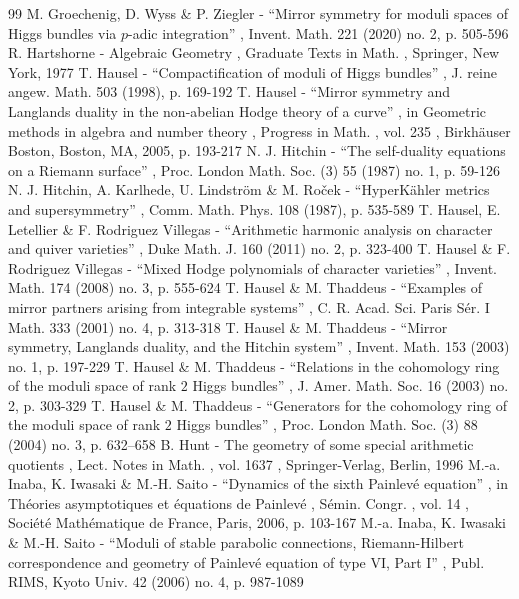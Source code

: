 \documentclass[11pt]{article}
\theoremstyle{definition}
\theoremstyle{plain}
\begin{document}
\begin{thebibliography}{99}
 M. Groechenig, D. Wyss \& P. Ziegler - “Mirror symmetry for moduli spaces of Higgs bundles via $p$-adic integration” , Invent. Math. 221 (2020) no. 2, p. 505-596
 R. Hartshorne - Algebraic Geometry , Graduate Texts in Math. , Springer, New York, 1977
 T. Hausel - “Compactification of moduli of Higgs bundles” , J. reine angew. Math. 503 (1998), p. 169-192
 T. Hausel - “Mirror symmetry and Langlands duality in the non-abelian Hodge theory of a curve” , in Geometric methods in algebra and number theory , Progress in Math. , vol. 235 , Birkhäuser Boston, Boston, MA, 2005, p. 193-217
 N. J. Hitchin - “The self-duality equations on a Riemann surface” , Proc. London Math. Soc. (3) 55 (1987) no. 1, p. 59-126
 N. J. Hitchin, A. Karlhede, U. Lindström \& M. Roček - “HyperKähler metrics and supersymmetry” , Comm. Math. Phys. 108 (1987), p. 535-589
 T. Hausel, E. Letellier \& F. Rodriguez Villegas - “Arithmetic harmonic analysis on character and quiver varieties” , Duke Math. J. 160 (2011) no. 2, p. 323-400
 T. Hausel \& F. Rodriguez Villegas - “Mixed Hodge polynomials of character varieties” , Invent. Math. 174 (2008) no. 3, p. 555-624
 T. Hausel \& M. Thaddeus - “Examples of mirror partners arising from integrable systems” , C. R. Acad. Sci. Paris Sér. I Math. 333 (2001) no. 4, p. 313-318
 T. Hausel \& M. Thaddeus - “Mirror symmetry, Langlands duality, and the Hitchin system” , Invent. Math. 153 (2003) no. 1, p. 197-229
 T. Hausel \& M. Thaddeus - “Relations in the cohomology ring of the moduli space of rank $2$ Higgs bundles” , J. Amer. Math. Soc. 16 (2003) no. 2, p. 303-329
 T. Hausel \& M. Thaddeus - “Generators for the cohomology ring of the moduli space of rank $2$ Higgs bundles” , Proc. London Math. Soc. (3) 88 (2004) no. 3, p. 632–658
 B. Hunt - The geometry of some special arithmetic quotients , Lect. Notes in Math. , vol. 1637 , Springer-Verlag, Berlin, 1996
 M.-a. Inaba, K. Iwasaki \& M.-H. Saito - “Dynamics of the sixth Painlevé equation” , in Théories asymptotiques et équations de Painlevé , Sémin. Congr. , vol. 14 , Société Mathématique de France, Paris, 2006, p. 103-167
 M.-a. Inaba, K. Iwasaki \& M.-H. Saito - “Moduli of stable parabolic connections, Riemann-Hilbert correspondence and geometry of Painlevé equation of type VI, Part I” , Publ. RIMS, Kyoto Univ. 42 (2006) no. 4, p. 987-1089

\end{thebibliography}
\end{document}
